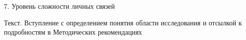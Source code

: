 \begin{frame}{7. Уровень сложности личных связей }

\tiny
Текст. Вступление с определением понятия области исследования и отсылкой к подробностям в Методических рекомендациях

\end{frame}


